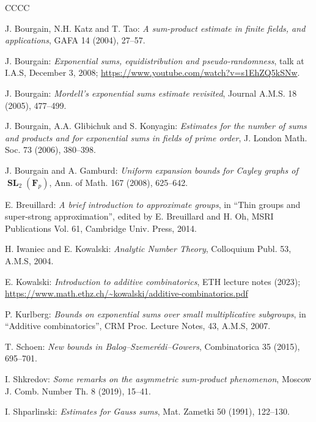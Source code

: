 \documentclass[12pt]{amsart}
\numberwithin{equation}{section}
\newcommand{\Ff}{\mathbf{F}}
\DeclareMathOperator{\SL}{\mathbf{SL}}
\theoremstyle{plain}
\theoremstyle{remark}
\theoremstyle{definition}
\begin{document}
\begin{thebibliography}{CCCC}


 J. Bourgain, N.H. Katz and T. Tao: \textit{A sum-product
    estimate in finite fields, and applications}, GAFA 14 (2004),
  27--57.
  

 J. Bourgain: \textit{Exponential sums,
    equidistribution and pseudo-randomness}, talk at I.A.S, December 3,
  2008; \url{https://www.youtube.com/watch?v=s1EhZQ5kSNw}.
  
 J. Bourgain: \textit{Mordell's exponential
    sums estimate revisited}, Journal A.M.S. 18 (2005), 477--499.

 J. Bourgain, A.A. Glibichuk and S. Konyagin:
  \textit{Estimates for the number of sums and products and for
    exponential sums in fields of prime order}, J. London Math. Soc. 73
  (2006), 380--398.

 J. Bourgain and A. Gamburd: \textit{Uniform
    expansion bounds for Cayley graphs of $\SL_2(\Ff_p)$}, Ann. of
  Math. 167 (2008), 625--642.

 E. Breuillard: \textit{A brief introduction to
    approximate groups}, in ``Thin groups and super-strong
  approximation'', edited by E. Breuillard and H. Oh, MSRI Publications
  Vol. 61, Cambridge Univ. Press, 2014.
  

 H. Iwaniec and E. Kowalski: \textit{Analytic Number
    Theory}, Colloquium Publ. 53, A.M.S, 2004.

 E. Kowalski: \textit{Introduction to additive
    combinatorics}, ETH lecture notes (2023);
  \url{https://www.math.ethz.ch/~kowalski/additive-combinatorics.pdf}
  
 P. Kurlberg: \textit{Bounds on exponential sums over
    small multiplicative subgroups}, in ``Additive combinatorics'', CRM
  Proc. Lecture Notes, 43, A.M.S, 2007.

 T. Schoen: \textit{New bounds in
    Balog--Szemerédi--Gowers}, Combinatorica 35 (2015), 695--701.

 I. Shkredov: \textit{Some remarks on the asymmetric
    sum-product phenomenon}, Moscow J. Comb. Number Th. 8 (2019),
  15--41.
  
 I. Shparlinski: \textit{Estimates for Gauss sums},
  Mat. Zametki 50 (1991), 122--130.

\end{thebibliography}
\end{document}
